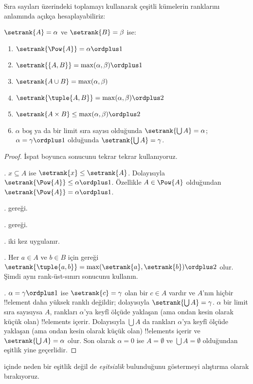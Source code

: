 \documentclass[../../../include/open-logic-section]{subfiles}
\begin{document}

Sıra sayıları üzerindeki toplamayı kullanarak çeşitli kümelerin ranklarını
 anlamında açıkça hesaplayabiliriz:

\begin{lem}
$\setrank{A}=\alpha$ ve $\setrank{B}=\beta$ ise:
\begin{enumerate}
	\item{} $\setrank{\Pow{A}}=\alpha\ordplus 1$
	\item{} $\setrank{\{A,B\}}=\max(\alpha,
	\beta)\ordplus 1$
	\item{} $\setrank{A\cup B}=\max(\alpha,
	\beta)$
	\item{} $\setrank{\tuple{A,B}}=\max(\alpha,
	\beta)\ordplus 2$
	\item{} $\setrank{A\times B}\leq\max(\alpha,
	\beta)\ordplus 2$
	\item{} $\alpha$ boş ya da bir limit sıra sayısı
	olduğunda $\setrank{\bigcup A}=\alpha$; $\alpha=\gamma\ordplus 1$
	olduğunda $\setrank{\bigcup A}=\gamma$.
\end{enumerate}
\end{lem}

\begin{proof}
İspat boyunca  sonucunu tekrar tekrar
kullanıyoruz.

\emph{.} $x\subseteq A$ ise
$\setrank{x}\leq\setrank{A}$. Dolayısıyla
$\setrank{\Pow{A}}\leq\alpha\ordplus 1$. Özellikle
$A\in\Pow{A}$ olduğundan $\setrank{\Pow{A}}=\alpha\ordplus 1$.

\emph{.}  gereği.

\emph{.}  gereği.

\emph{.}  iki kez uygulanır.

\emph{.} Her $a\in A$ ve $b\in B$ için
 gereği
$\setrank{\tuple{a,b}}=\max(\setrank{a},\setrank{b})\ordplus 2$ olur.
Şimdi aynı rank-üst-sınırı sonucunu kullanın.

\emph{.} $\alpha=\gamma\ordplus 1$ ise
$\setrank{c}=\gamma$ olan bir $c\in A$ vardır ve $A$'nın hiçbir
!!{element} daha yüksek ranklı değildir; dolayısıyla
$\setrank{\bigcup A}=\gamma$. $\alpha$ bir limit sıra sayısıysa $A$,
rankları $\alpha$'ya keyfî ölçüde yaklaşan (ama ondan kesin olarak küçük
olan) !!{element}s içerir. Dolayısıyla $\bigcup A$ da rankları $\alpha$'ya
keyfî ölçüde yaklaşan (ama ondan kesin olarak küçük olan) !!{element}s
içerir ve $\setrank{\bigcup A}=\alpha$ olur. Son olarak $\alpha=0$ ise
$A=\emptyset$ ve $\bigcup A=\emptyset$ olduğundan eşitlik yine geçerlidir.
\end{proof}
\noindent
{} içinde neden bir eşitlik değil de
\emph{eşitsizlik} bulunduğunu göstermeyi alıştırma olarak bırakıyoruz.
\end{document}
